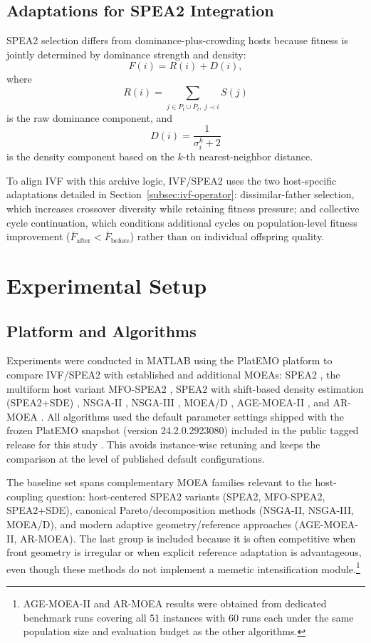 \documentclass[pdflatex,sn-mathphys-ay]{sn-jnl}%
\theoremstyle{thmstyleone}%
\theoremstyle{thmstyletwo}%
\theoremstyle{thmstylethree}%
\begin{document}
\subsection{Adaptations for SPEA2 Integration}\label{subsec:adaptation}
SPEA2 selection differs from dominance-plus-crowding hosts because fitness is jointly determined by dominance strength and density:
\[
	F(i) = R(i) + D(i),
\]
where
\[
	R(i) = \sum_{j \in P_t \cup \bar{P}_t,\; j \prec i} S(j)
\]
is the raw dominance component, and
\[
	D(i) = \frac{1}{\sigma_i^k + 2}
\]
is the density component based on the $k$-th nearest-neighbor distance.

To align IVF with this archive logic, IVF/SPEA2 uses the two host-specific adaptations detailed in Section~\ref{subsec:ivf-operator}: dissimilar-father selection, which increases crossover diversity while retaining fitness pressure; and collective cycle continuation, which conditions additional cycles on population-level fitness improvement ($\bar{F}_{\text{after}}<\bar{F}_{\text{before}}$) rather than on individual offspring quality.


\section{Experimental Setup}\label{sec:setup}

\subsection{Platform and Algorithms}\label{subsec:platform}
Experiments were conducted in MATLAB using the PlatEMO platform \citep{platemo} to compare IVF/SPEA2 with established and additional MOEAs: SPEA2 \citep{zitzler2001spea2}, the multiform host variant MFO-SPEA2 \citep{jiao2023multiform}, SPEA2 with shift-based density estimation (SPEA2+SDE) \citep{li2014shift}, NSGA-II \citep{deb2002fast}, NSGA-III \citep{deb2014nsga3}, MOEA/D \citep{zhang2007moead}, AGE-MOEA-II \citep{panichella2022agemoeaii}, and AR-MOEA \citep{tian2018armoea}. All algorithms used the default parameter settings shipped with the frozen PlatEMO snapshot (version 24.2.0.2923080) included in the public tagged release for this study \citep{zambrano2026ivfspea2repo}. This avoids instance-wise retuning and keeps the comparison at the level of published default configurations.

The baseline set spans complementary MOEA families relevant to the host-coupling question: host-centered SPEA2 variants (SPEA2, MFO-SPEA2, SPEA2+SDE), canonical Pareto/decomposition methods (NSGA-II, NSGA-III, MOEA/D), and modern adaptive geometry/reference approaches (AGE-MOEA-II, AR-MOEA). The last group is included because it is often competitive when front geometry is irregular or when explicit reference adaptation is advantageous, even though these methods do not implement a memetic intensification module.\footnote{AGE-MOEA-II and AR-MOEA results were obtained from dedicated benchmark runs covering all 51 instances with 60 runs each under the same population size and evaluation budget as the other algorithms.}
\end{document}
